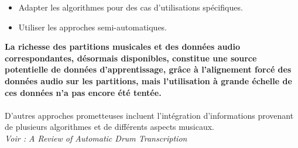 \begin{itemize}
	\item Adapter les algorithmes pour des cas d’utilisations spécifiques.
	\item Utiliser les approches semi-automatiques.\\
\end{itemize}
\textbf{La richesse des partitions musicales et des données audio correspondantes, désormais disponibles, constitue une source potentielle de données d'apprentissage, grâce à l'alignement forcé des données audio sur les partitions, mais l'utilisation à grande échelle de ces données n'a pas encore été tentée.}\\\\
D'autres approches prometteuses incluent l'intégration d'informations provenant de plusieurs algorithmes et de différents aspects musicaux.\\
\textit{Voir : A Review of Automatic Drum Transcription}\cite{8350302}
